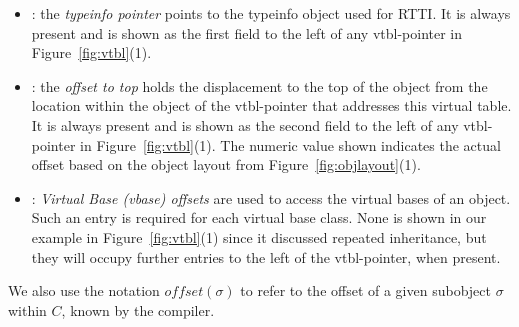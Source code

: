 \begin{itemize}
\setlength{\itemsep}{0pt}
\setlength{\parskip}{0pt}
\item {}: the \emph{typeinfo pointer} points to the typeinfo 
      object used for RTTI. It is always present and is shown as the first field 
      to the left of any vtbl-pointer in Figure~\ref{fig:vtbl}(1).
\item {}: the \emph{offset to top} holds the displacement to 
      the top of the object from the location within the object of the 
      vtbl-pointer that addresses this virtual table. It is always present and 
      is shown as the second field to the left of any vtbl-pointer in 
      Figure~\ref{fig:vtbl}(1). The numeric value shown indicates the actual 
      offset based on the object layout from Figure~\ref{fig:objlayout}(1).
\item {}: \emph{Virtual Base (vbase) offsets} are used to access 
      the virtual bases of an object. Such an entry is required for each virtual 
      base class. None is shown in our example in Figure~\ref{fig:vtbl}(1) 
      since it discussed repeated inheritance, but they will occupy further 
      entries to the left of the vtbl-pointer, when present.
\end{itemize}

\noindent
We also use the notation $\mathit{offset}(\sigma)$ to refer to the offset of a 
given subobject $\sigma$ within $C$, known by the compiler.

